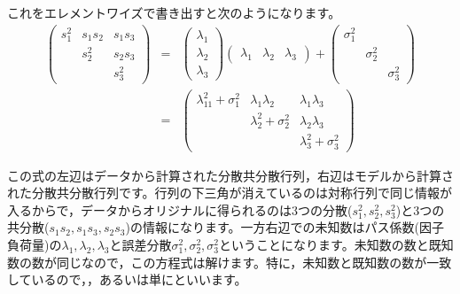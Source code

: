 \documentclass{ltjsbook}
\begin{document}
これをエレメントワイズで書き出すと次のようになります。
\begin{eqnarray*}
\begin{pmatrix} s_1^2 & s_1s_2 & s_1s_3 \\
                                    &  s_2^2   & s_2s_3\\
                                    &              & s_3^2 \end{pmatrix}
                                            &=& \begin{pmatrix} \lambda_1\\ \lambda_2 \\ \lambda_3 \end{pmatrix}\begin{pmatrix} \lambda_1 & \lambda_2 & \lambda_3 \end{pmatrix} + \begin{pmatrix} \sigma_1^2 & & \\ & \sigma_2^2 & \\ & & \sigma_3^2 \end{pmatrix} \\
                                                &=& \begin{pmatrix} \lambda_11^2 + \sigma_1^2 & \lambda_1\lambda_2 & \lambda_1 \lambda_3 \\
                                                                                                                                  & \lambda_2^2 + \sigma_2^2 & \lambda_2 \lambda_3 \\
                                                                                                                                  &                                               & \lambda_3^2 + \sigma_3^2 \end{pmatrix}
\end{eqnarray*}

この式の左辺はデータから計算された分散共分散行列，右辺はモデルから計算された分散共分散行列です。行列の下三角が消えているのは対称行列で同じ情報が入るからで，データからオリジナルに得られるのは3つの分散($s_1^2,s_2^2,s_3^2$)と3つの共分散($s_1s_2,s_1s_3,s_2s_3$)の情報になります。一方右辺での未知数はパス係数(因子負荷量)の$\lambda_1,\lambda_2,\lambda_3$と誤差分散$\sigma_1^2,\sigma_2^2,\sigma_3^2$ということになります。未知数の数と既知数の数が同じなので，この方程式は解けます。特に，未知数と既知数の数が一致しているので，，あるいは単にといいます。
\end{document}
